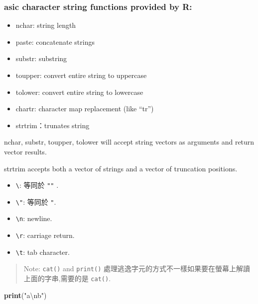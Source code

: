 \documentclass[]{book}
\newenvironment{Shaded}{\begin{snugshade}}{\end{snugshade}}
\newcommand{\KeywordTok}[1]{\textcolor[rgb]{0.13,0.29,0.53}{\textbf{#1}}}
\newcommand{\CharTok}[1]{\textcolor[rgb]{0.31,0.60,0.02}{#1}}
\newcommand{\StringTok}[1]{\textcolor[rgb]{0.31,0.60,0.02}{#1}}
\newcommand{\NormalTok}[1]{#1}
\providecommand{\tightlist}{%
  \setlength{\itemsep}{0pt}\setlength{\parskip}{0pt}}
\theoremstyle{definition}
\theoremstyle{definition}
\theoremstyle{definition}
\theoremstyle{remark}
\begin{document}
\subsubsection{asic character string functions provided by
R:}\label{asic-character-string-functions-provided-by-r}

\begin{itemize}
\tightlist
\item
  nchar: string length\\
\item
  paste: concatenate strings
\item
  substr: substring
\item
  toupper: convert entire string to uppercase
\item
  tolower: convert entire string to lowercase
\item
  chartr: character map replacement (like ``tr'')
\item
  strtrim：trunates string
\end{itemize}

nchar, substr, toupper, tolower will accept string vectors as arguments
and return vector results.

strtrim accepts both a vector of strings and a vector of truncation
positions.

\begin{itemize}
\tightlist
\item
  \texttt{\textbackslash{}\textquotesingle{}}: 等同於
  \texttt{"\textquotesingle{}"} .\\
\item
  \texttt{\textbackslash{}"}: 等同於
  \texttt{\textquotesingle{}"\textquotesingle{}}.\\
\item
  \texttt{\textbackslash{}n}: newline.\\
\item
  \texttt{\textbackslash{}r}: carriage return.\\
\item
  \texttt{\textbackslash{}t}: tab character.
\end{itemize}

\begin{quote}
Note: \texttt{cat()} and \texttt{print()}
處理逃逸字元的方式不一樣如果要在螢幕上解讀上面的字串,需要的是
\texttt{cat()}.
\end{quote}

\begin{Shaded}
\begin{Highlighting}[]
\KeywordTok{print}\NormalTok{(}\StringTok{"a}\CharTok{\textbackslash{}n}\StringTok{b"}\NormalTok{)}
\end{Highlighting}
\end{Shaded}
\end{document}
